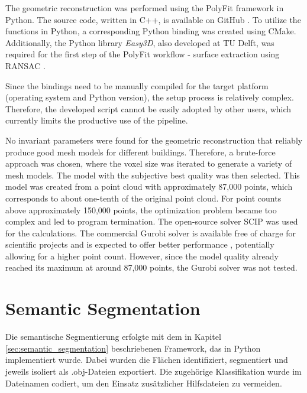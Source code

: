 \begin{English}
    The geometric reconstruction was performed using the PolyFit framework in Python. The source code, written in C++, is available on GitHub \cite{nanLiangliangNanPolyFit2025}. To utilize the functions in Python, a corresponding Python binding was created using CMake. Additionally, the Python library \textit{Easy3D}, also developed at TU Delft, was required for the first step of the PolyFit workflow - surface extraction using RANSAC \cite{nanLiangliangNanEasy3D2025}.

    Since the bindings need to be manually compiled for the target platform (operating system and Python version), the setup process is relatively complex. Therefore, the developed script cannot be easily adopted by other users, which currently limits the productive use of the pipeline.

    No invariant parameters were found for the geometric reconstruction that reliably produce good mesh models for different buildings. Therefore, a brute-force approach was chosen, where the voxel size was iterated to generate a variety of mesh models. The model with the subjective best quality was then selected. This model was created from a point cloud with approximately 87,000 points, which corresponds to about one-tenth of the original point cloud. For point counts above approximately 150,000 points, the optimization problem became too complex and led to program termination. The open-source solver SCIP was used for the calculations. The commercial Gurobi solver is available free of charge for scientific projects and is expected to offer better performance \cite{nanLiangliangNanPolyFit2025}, potentially allowing for a higher point count. However, since the model quality already reached its maximum at around 87,000 points, the Gurobi solver was not tested.
\end{English}

\section{Semantic Segmentation}
\begin{German}
    Die semantische Segmentierung erfolgte mit dem in Kapitel \ref{sec:semantic_segmentation} beschriebenen Framework, das in Python implementiert wurde. Dabei wurden die Flächen identifiziert, segmentiert und jeweils isoliert als .obj-Dateien exportiert. Die zugehörige Klassifikation wurde im Dateinamen codiert, um den Einsatz zusätzlicher Hilfsdateien zu vermeiden.
\end{German}

